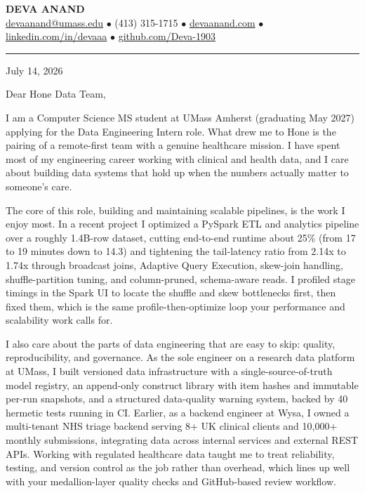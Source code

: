 \documentclass[letterpaper,11pt]{article}
\begin{document}
\begin{center}
    {\fontsize{18}{20}\selectfont\bfseries DEVA ANAND}\\ \vspace{3pt}
    {\small
    \href{mailto:devaanand@umass.edu}{devaanand@umass.edu}
    \enspace$\bullet$\enspace
    (413) 315-1715
    \enspace$\bullet$\enspace
    \href{https://devaanand.com}{devaanand.com}
    \enspace$\bullet$\enspace
    \href{https://linkedin.com/in/devaaa/}{linkedin.com/in/devaaa}
    \enspace$\bullet$\enspace
    \href{https://github.com/Deva-1903}{github.com/Deva-1903}}
\end{center}
\vspace{6pt}
\hrule
\vspace{10pt}

July 14, 2026

\vspace{2pt}

Dear Hone Data Team,

I am a Computer Science MS student at UMass Amherst (graduating May 2027) applying for the Data Engineering Intern role. What drew me to Hone is the pairing of a remote-first team with a genuine healthcare mission. I have spent most of my engineering career working with clinical and health data, and I care about building data systems that hold up when the numbers actually matter to someone's care.

The core of this role, building and maintaining scalable pipelines, is the work I enjoy most. In a recent project I optimized a PySpark ETL and analytics pipeline over a roughly 1.4B-row dataset, cutting end-to-end runtime about 25\% (from 17 to 19 minutes down to 14.3) and tightening the tail-latency ratio from 2.14x to 1.74x through broadcast joins, Adaptive Query Execution, skew-join handling, shuffle-partition tuning, and column-pruned, schema-aware reads. I profiled stage timings in the Spark UI to locate the shuffle and skew bottlenecks first, then fixed them, which is the same profile-then-optimize loop your performance and scalability work calls for.

I also care about the parts of data engineering that are easy to skip: quality, reproducibility, and governance. As the sole engineer on a research data platform at UMass, I built versioned data infrastructure with a single-source-of-truth model registry, an append-only construct library with item hashes and immutable per-run snapshots, and a structured data-quality warning system, backed by 40 hermetic tests running in CI. Earlier, as a backend engineer at Wysa, I owned a multi-tenant NHS triage backend serving 8+ UK clinical clients and 10,000+ monthly submissions, integrating data across internal services and external REST APIs. Working with regulated healthcare data taught me to treat reliability, testing, and version control as the job rather than overhead, which lines up well with your medallion-layer quality checks and GitHub-based review workflow.
\end{document}
